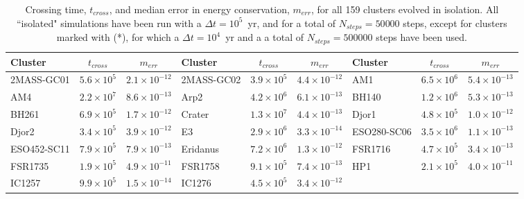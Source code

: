         \begin{table}
        \caption{Crossing time, $t_{cross}$, and median error in energy conservation, $m_{err}$, for all 159 clusters evolved in isolation. All ``isolated" simulations have been run with a $\Delta t=10^5$~yr, and for a total of $N_{steps}=50 000$ steps, except for clusters marked with (*), for which a $\Delta t=10^4$~yr and a a total of $N_{steps}=500 000$ steps have been used. }\label{tcross-energy}
        \tiny
        \begin{center}
        \begin{tabular}{l | c | c | l |  c|   c | l | c | c } 
        \hline
                Cluster &       $ t_{cross}$ &  $m_{err}$ & Cluster &       $ t_{cross}$ &  $m_{err}$  & Cluster &       $ t_{cross}$ &  $m_{err}$ \\
                \hline \hline
            2MASS-GC01 & $5.6\times10^5$ &         $ 2.1\times10^{-12}$  &
            2MASS-GC02 &  $3.9\times10^5$ &          $4.4\times10^{-12}$ &
                AM1 &  $6.5\times10^6$ &          $5.4\times10^{-13}$ \\
                AM4 &  $2.2\times10^7$ &          $8.6\times10^{-13}$ & 
                Arp2 &  $4.2\times10^6$ &          $6.1\times10^{-13}$ &  
                BH140 &  $1.2\times10^6$ &         $ 5.3\times10^{-13}$  \\
                BH261 &  $6.9\times10^5$ &          $1.7\times10^{-12}$  &
                Crater &  $1.3\times10^7$ &         $ 4.4\times10^{-13}$ &
                Djor1 &  $4.8\times10^5$ &          $1.0\times10^{-12}$  \\
                Djor2 &  $3.4\times10^5$ &          $3.9\times10^{-12}$ &
                    E3 &  $2.9\times10^6$ &          $3.3\times10^{-14}$  &
        ESO280-SC06 &  $3.5\times10^6$ &         $ 1.1\times10^{-13}$  \\
        ESO452-SC11 &  $7.9\times10^5$ &          $7.9\times10^{-13}$  &
            Eridanus &  $7.2\times10^6$ &          $1.3\times10^{-12}$ &
            FSR1716 &  $4.7\times10^5$ &         $ 3.4\times10^{-13}$  \\
            FSR1735 &  $1.9\times10^5$ &          $4.9\times10^{-11}$ &
            FSR1758 &  $9.1\times10^5$ &          $7.4\times10^{-13}$  &
                HP1 &  $2.1\times10^5$ &          $4.0\times10^{-11}$  \\
                IC1257 &  $9.9\times10^5$ &         $ 1.5\times10^{-14}$ &
                IC1276 &  $4.5\times10^5$ &          $3.4\times10^{-12}$ &

\end{tabular}
\end{center}
\end{table}
